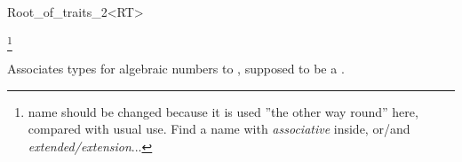 \begin{ccRefClass}{Root_of_traits_2<RT>}

\footnote{name should be changed because it is used ''the other way round'' here, compared with usual use. Find a name with \textit{associative} inside, or/and \textit{extended/extension}...}

\ccDefinition

Associates types for algebraic numbers to , supposed to be a . 

\ccTypes


\end{ccRefClass}

